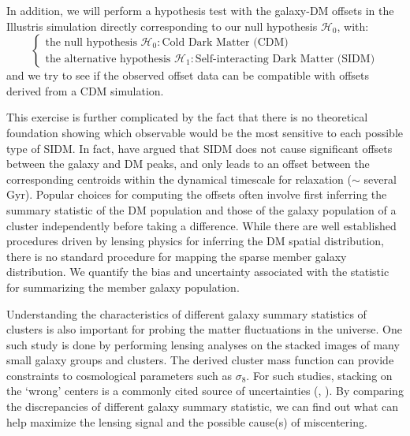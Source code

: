 In addition, we will perform a hypothesis test with the galaxy-DM offsets in
the Illustris simulation directly corresponding to our null hypothesis
$\mathcal{H}_0$, with: 
\begin{equation}
\begin{cases}
	\text{the null hypothesis }\mathcal{H}_0: \text{Cold Dark Matter (CDM)} \\
	\text{the alternative hypothesis }\mathcal{H}_1: \text{Self-interacting Dark
	Matter (SIDM)} 
\end{cases}
\end{equation}
and we try to see if the observed offset data can be compatible with offsets
derived from a CDM simulation. 


This exercise is further complicated by the fact that there is no theoretical
foundation showing which observable would be the most sensitive to each
possible type of SIDM. In fact, \cite{Kahlhoefer14} have argued that SIDM 
does not cause
significant offsets between the galaxy and DM peaks, and only leads to an offset
between the corresponding centroids within the dynamical timescale for
relaxation ($\sim$ several Gyr). 
Popular choices for computing the offsets often involve first inferring the summary
statistic of the DM population and those of the galaxy population of a cluster
independently before taking a difference.
While there are well established procedures driven by lensing physics for 
inferring the DM spatial distribution, there is no standard procedure for
mapping the sparse member galaxy distribution. 
We quantify the bias and uncertainty associated with the
statistic for summarizing the member galaxy population. 

Understanding the characteristics of different galaxy
summary statistics of clusters is also important for  
probing the matter fluctuations in the universe. 
One such study is done by performing lensing analyses on the stacked images of 
many small galaxy groups and clusters. 
The derived cluster mass function can provide constraints to cosmological
parameters such as $\sigma_8$. 
For such studies, stacking on the `wrong' centers is a commonly cited
source of uncertainties (\citealt{Johnston2007b},
\citealt{Ford2014}). By comparing the discrepancies of different galaxy
summary statistic, we can find out what can help maximize the lensing signal and 
the possible cause(s) of miscentering. 

